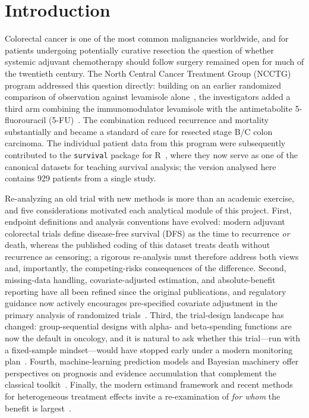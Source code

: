\section{Introduction}\label{sec:intro}

Colorectal cancer is one of the most common malignancies worldwide, and for
patients undergoing potentially curative resection the question of whether
systemic adjuvant chemotherapy should follow surgery remained open for much
of the twentieth century. The North Central Cancer Treatment Group (NCCTG)
program addressed this question directly: building on an earlier randomized
comparison of observation against levamisole alone~\cite{laurie1989}, the
investigators added a third arm combining the immunomodulator levamisole
with the antimetabolite 5-fluorouracil (5-FU)~\cite{moertel1990}. The
combination reduced recurrence and mortality substantially and became a
standard of care for resected stage B/C colon carcinoma. The individual
patient data from this program were subsequently contributed to the
\texttt{survival} package for R~\cite{therneau2026}, where they now serve as
one of the canonical datasets for teaching survival analysis; the version
analysed here contains 929 patients from a single study.

Re-analyzing an old trial with new methods is more than an academic
exercise, and five considerations motivated each analytical module of this
project. First, endpoint definitions and analysis conventions have evolved:
modern adjuvant colorectal trials define disease-free survival (DFS) as the
time to recurrence \emph{or} death, whereas the published coding of this
dataset treats death without recurrence as censoring; a rigorous
re-analysis must therefore address both views and, importantly, the
competing-risks consequences of the difference. Second, missing-data
handling, covariate-adjusted estimation, and absolute-benefit reporting
have all been refined since the original publications, and regulatory
guidance now actively encourages pre-specified covariate adjustment in the
primary analysis of randomized trials~\cite{fda2023,kahan2014}. Third, the
trial-design landscape has changed: group-sequential designs with alpha-
and beta-spending functions are now the default in oncology, and it is
natural to ask whether this trial---run with a fixed-sample
mindset---would have stopped early under a modern monitoring
plan~\cite{lan-demets1983,o1979}. Fourth, machine-learning prediction
models and Bayesian machinery offer perspectives on prognosis and evidence
accumulation that complement the classical
toolkit~\cite{harrell2015,gelman2013}. Finally, the modern estimand
framework and recent methods for heterogeneous treatment effects invite a
re-examination of \emph{for whom} the benefit is
largest~\cite{hernan2020}.

